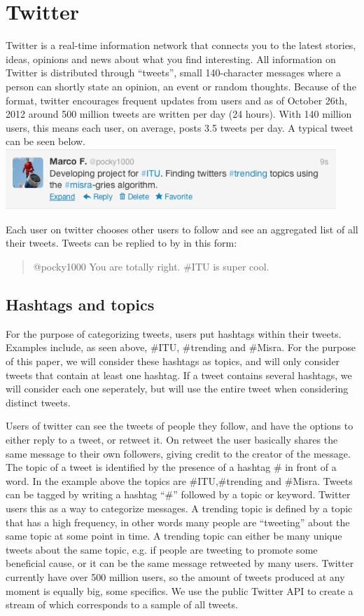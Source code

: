 \section{Twitter}
Twitter is a real-time information network that connects you to the latest stories, ideas, opinions and news about what you find interesting. All information on Twitter is distributed through ``tweets'', small 140-character messages where a person can shortly state an opinion, an event or random thoughts. Because of the format, twitter encourages frequent updates from users and as of October 26th, 2012 around 500 million tweets are written per day (24 hours)\cite{Cnet1}. With 140 million users, this means each user, on average, posts 3.5 tweets per day. A typical tweet can be seen below.
\newline
\includegraphics[width=125mm]{tweet.png}
\newline

Each user on twitter chooses other users to follow and see an aggregated list of all their tweets. Tweets can be replied to by in this form:

\begin{quote}
    @pocky1000 You are totally right. \#ITU is super cool.
\end{quote}

\subsection{Hashtags and topics}
For the purpose of categorizing tweets, users put hashtags within their tweets. Examples include, as seen above, \#ITU, \#trending and \#Misra. For the purpose of this paper, we will consider these hashtags as topics, and will only consider tweets that contain at least one hashtag. If a tweet contains several hashtags, we will consider each one seperately, but will use the entire tweet when considering distinct tweets.

Users of twitter can see the tweets of people they follow, and have the options to either reply to a tweet, or retweet it. On retweet the user basically shares the same message to their own followers, giving credit to the creator of the message.
The topic of a tweet is identified by the presence of a hashtag \# in front of a word. In the example above the topics are \#ITU,\#trending and \#Misra.
Tweets can be tagged by writing a hashtag ``\#'' followed by a topic or keyword. Twitter users this as a way to categorize messages.
A trending topic is defined by a topic that has a high frequency, in other words many people are ``tweeting'' about the same topic at some point in time. A trending topic can either be many unique tweets about the same topic, e.g. if people are tweeting to promote some beneficial cause, or it can be the same message retweeted by many users.
Twitter currently have over 500 million users, so the amount of tweets produced at any moment is equally big, some specifics. We use the public Twitter API to create a stream of which corresponds to a sample of all tweets. 